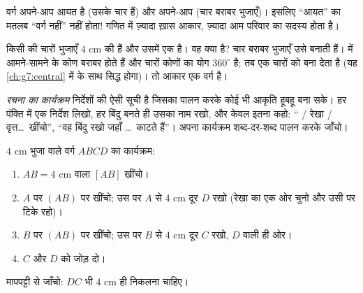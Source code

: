 \begin{remark}
वर्ग अपने-आप आयत है (उसके चार  हैं) और अपने-आप
 (चार बराबर भुजाएँ)। इसलिए ``आयत'' का मतलब ``वर्ग
नहीं'' नहीं होता! गणित में ज़्यादा ख़ास आकार, ज़्यादा आम परिवार का
सदस्य होता है।
\end{remark}

\begin{example}[गुणों से आकार पहचानना]\label{ex:g6:shapes:recognize}
किसी  की चारों भुजाएँ $4$ cm की हैं और उसमें एक 
है। वह क्या है? चार बराबर भुजाएँ उसे  बनाती हैं।
 में आमने-सामने के कोण बराबर होते हैं और चारों कोणों
का योग $360^\circ$ है; तब एक  चारों को  बना देता है
(यह \cref{ch:g7:central} में   के साथ सिद्ध
होगा)। तो आकार एक वर्ग है।
\end{example}

\begin{method}[रचना के कार्यक्रम]\label{met:g6:shapes:program}
\emph{रचना का कार्यक्रम} निर्देशों की ऐसी सूची है जिसका पालन करके
कोई भी आकृति हूबहू बना सके। हर पंक्ति में एक निर्देश लिखो, हर
बिंदु बनते ही उसका नाम रखो, और केवल इतना कहो: `` / रेखा /
वृत्त\dots\ खींचो'', ``वह बिंदु रखो जहाँ \dots\ काटते हैं''।
अपना कार्यक्रम शब्द-दर-शब्द पालन करके जाँचो।
\end{method}

\begin{example}\label{ex:g6:shapes:program}
$4$ cm भुजा वाले वर्ग $ABCD$ का कार्यक्रम:
\begin{enumerate}
  \item $AB = 4$ cm वाला  $[AB]$ खींचो।
  \item $A$ पर $(AB)$ पर  खींचो; उस पर $A$ से $4$ cm दूर $D$
        रखो (रेखा का एक ओर चुनो और उसी पर टिके रहो)।
  \item $B$ पर $(AB)$ पर  खींचो; उस पर $B$ से $4$ cm दूर $C$
        रखो, $D$ वाली ही ओर।
  \item $C$ और $D$ को जोड़ दो।
\end{enumerate}
मापपट्टी से जाँचो: $DC$ भी $4$ cm ही निकलना चाहिए।
\end{example}

